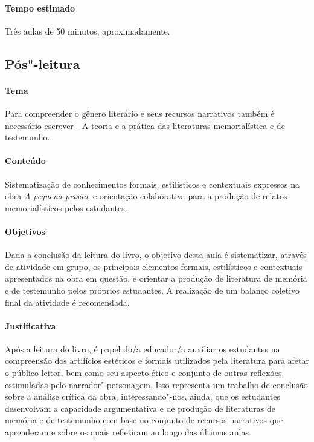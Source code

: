 \documentclass[11pt]{extarticle}
\begin{document}
\paragraph{Tempo estimado} Três aulas de 50 minutos, aproximadamente.


\subsection{Pós"-leitura}

\paragraph{Tema} Para compreender o gênero literário e seus recursos
narrativos também é necessário escrever - A teoria e a prática das
literaturas memorialística e de testemunho.

\paragraph{Conteúdo} Sistematização de conhecimentos formais, estilísticos
e contextuais expressos na obra \emph{A pequena prisão}, e orientação
colaborativa para a produção de relatos memorialísticos pelos
estudantes.

\paragraph{Objetivos} Dada a conclusão da leitura do livro, o objetivo
desta aula é sistematizar, através de atividade em grupo, os principais
elementos formais, estilísticos e contextuais apresentados na obra em
questão, e orientar a produção de literatura de memória e de testemunho
pelos próprios estudantes. A realização de um balanço coletivo final da
atividade é recomendada.

\paragraph{Justificativa} Após a leitura do livro, é papel do/a educador/a
auxiliar os estudantes na compreensão dos artifícios estéticos e formais
utilizados pela literatura para afetar o público leitor, bem como seu
aspecto ético e conjunto de outras reflexões estimuladas pelo
narrador"-personagem. Isso representa um trabalho de conclusão sobre a
análise crítica da obra, interessando"-nos, ainda, que os estudantes
desenvolvam a capacidade argumentativa e de produção de literaturas de
memória e de testemunho com base no conjunto de recursos narrativos que
aprenderam e sobre os quais refletiram ao longo das últimas aulas.
\end{document}
